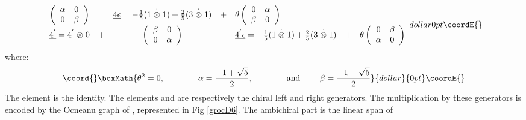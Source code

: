\documentclass[a4paper,11pt]{article}
\def\text#1{\mbox{\rm #1\ }}
\def \otimesdot {\stackrel{\cdot}{\otimes}}
\providecommand{\ud}[1]{\underline{#1}}
\begin{document}
$${\begin{array}{cccclcc}
\left( \begin{array}{cc} \alpha & 0 \\ 0 & \beta \\ \end{array} \right)
&{}&
\underline{4\epsilon} = -\frac{1}{5} (1 \otimesdot 1) + \frac{2}{5} (3
\otimesdot 1)                     &+&
\theta \left( \begin{array}{cc} 0 & \alpha \\ \beta & 0 \\
\end{array} \right) \\
\underline{4^{'}}     = 4^{'} \otimesdot 0 &+&
\left( \begin{array}{cc} \beta & 0 \\ 0 & \alpha \\ \end{array} \right)
&{}&
\underline{4^{'}\epsilon} = -\frac{1}{5} (1 \otimesdot 1) + \frac{2}{5}
(3 \otimesdot 1)                      &+&
\theta \left( \begin{array}{cc} 0 & \beta \\ \alpha & 0 \\ \end{array} \right)
\end{array}
}{dollar}{0pt}\coordE{}$$
where:
$$\coord{}\boxMath{
\theta^2 = 0, \qquad \qquad
\alpha   = \frac{-1+\sqrt{5}}{2}, \qquad \qquad
\text{and} \qquad
\beta    = \frac{-1-\sqrt{5}}{2}
}{dollar}{0pt}\coordE{}$$
The element \coordHE{} is the identity. The elements
\coordHE{} and \myHighlight{$\underline{1\epsilon}$}\coordHE{} are respectively the
chiral left and right generators.
The multiplication by these generators is encoded by the Ocneanu
graph of \coordHE{}, represented in Fig \ref{grocD6}.
The ambichiral part is the linear span of \myHighlight{$\{ \ud0, \ud{2}, \ud{4},
\ud{4^{'}} \}$}\coordHE{}
\end{document}
